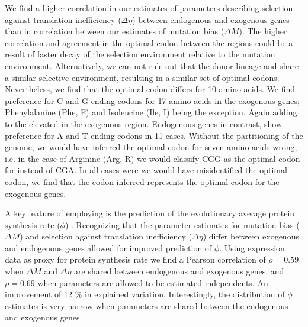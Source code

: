 \documentclass[12pt, letter]{article}
\begin{document}
We find a higher correlation in our estimates of parameters describing selection against translation inefficiency ($\Delta \eta$) between endogenous and exogenous genes than in correlation between our estimates of mutation bias ($\Delta M$).  
The higher correlation and agreement in the optimal codon between the regions could be a result of faster decay of the selection environment relative to the mutation environment.
Alternatively, we can not rule out that the donor lineage and \kluyveri share a similar selective environment, resulting in a similar set of optimal codons.
Nevertheless, we find that the optimal codon differs for 10 amino acids. 
We find preference for C and G ending codons for 17 amino acids in the exogenous genes; Phenylalanine (Phe, F) and Isoleucine (Ile, I) being the exception. 
Again adding to the elevated \GC in the exogenous region.
Endogenous genes in contrast, show preference for A and T ending codons in 11 cases.
Without the partitioning of the \kluyveri genome, we would have inferred the optimal codon for seven amino acids wrong, i.e. in the case of Arginine (Arg, R) we would classify CGG as the optimal codon for \kluyveri instead of CGA. 
In all cases were we would have misidentified the optimal codon, we find that the codon inferred represents the optimal codon for the exogenous genes.

A key feature of employing \ROC is the prediction of the evolutionary average protein synthesis rate ($\phi$) \citep{gilchrist2015}.
Recognizing that the parameter estimates for mutation bias ($\Delta M$) and selection against translation inefficiency ($\Delta \eta$) differ between exogenous and endogenous genes allowed for improved prediction of $\phi$.
Using expression data  as proxy for protein synthesis rate we find a Pearson correlation of $\rho = 0.59$ when $\Delta M$ and $\Delta \eta$ are shared between endogenous and exogenous genes, and $\rho = 0.69$ when parameters are allowed to be estimated independents. 
An improvement of 12 \% in explained variation.
Interestingly, the distribution of $\phi$ estimates is very narrow when parameters are shared between the endogenous and exogenous genes. %
\end{document}
